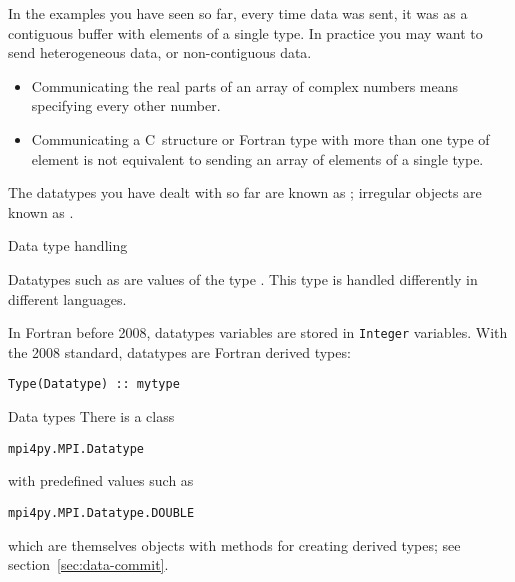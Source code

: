 

In the examples you have seen so far, every time data was sent,
it was as a contiguous buffer with elements of a single type.
In practice you may want to send heterogeneous data, or
non-contiguous data.
\begin{itemize}
\item Communicating the real parts of an array of complex numbers
  means specifying every other number.
\item Communicating a C~structure or Fortran type with more than one
  type of element is not equivalent to sending an array of elements of
  a single type.
\end{itemize}
The datatypes you have dealt with so far are known as
; irregular objects
are known as .

 {Data type handling}
\label{sec:mpi-datatype}

Datatypes such as  are values
of the type .
This type is handled differently in different languages.

\begin{fortrannote}
  In Fortran before 2008, datatypes variables are stored in
  \lstinline{Integer} variables.
  With the 2008 standard, datatypes are Fortran derived types:
\begin{lstlisting}
Type(Datatype) :: mytype
\end{lstlisting}
\end{fortrannote}

\begin{pythonnote}{Data types}
  There is a class
\begin{lstlisting}
mpi4py.MPI.Datatype
\end{lstlisting}
  with predefined values such as 
\begin{lstlisting}
mpi4py.MPI.Datatype.DOUBLE
\end{lstlisting}
  which are themselves objects with methods
  for creating derived types;
  see section~\ref{sec:data-commit}.
\end{pythonnote}

